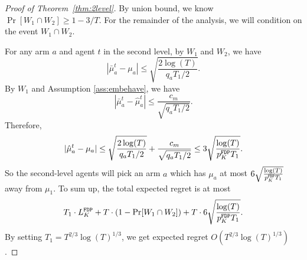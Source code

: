 \begin{proof}[Proof of Theorem~\ref{thm:2level}]
By union bound, we know $\Pr[W_1 \cap W_2] \geq 1 - 3/T$. For the
remainder of the analysis, we will condition on the event
$W_1 \cap W_2$.

For any arm $a$ and agent $t$ in the second level, by $W_1$ and $W_2$, we have
\[
|\bar{\mu}^t_a - \mu_a| \leq \sqrt{\frac{2\log(T)}{q_aT_1 /2}}.
\]
By $W_1$ and Assumption \ref{ass:embehave}, we have
\[
|\bar{\mu}^t_a - \hat{\mu}^t_a| \leq \frac{c_m}{\sqrt{q_aT_1/2}}.
\]
Therefore,
\[
|\hat{\mu}^t_a - \mu_a|\leq \sqrt{\frac{2\log(T)}{q_aT_1 /2}}+\frac{c_m}{\sqrt{q_aT_1/2}} \leq 3 \sqrt{\frac{\log(T)}{p^\mathtt{FDP}_K T_1 }}.
\]
So the second-level agents will pick an arm $a$ which has $\mu_a$ at most $6 \sqrt{\frac{\log(T)}{p^\mathtt{FDP}_K T_1 }}$ away from $\mu_1$. To sum up, the total expected regret is at most
\[
T_1 \cdot L^\mathtt{FDP}_K + T \cdot (1-\Pr[W_1 \cap W_2]) + T \cdot  6 \sqrt{\frac{\log(T)}{p^\mathtt{FDP}_K T_1 }}.
\]
By setting $T_1 = T^{2/3}\log(T)^{1/3}$, we get expected regret $O(T^{2/3}\log(T)^{1/3})$.
\end{proof}
